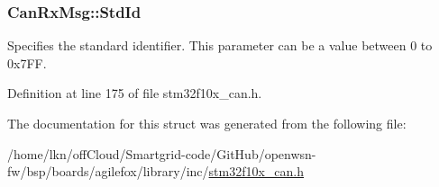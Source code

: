 \subsubsection[{\texorpdfstring{Std\+Id}{StdId}}]{ Can\+Rx\+Msg\+::\+Std\+Id}\hypertarget{struct_can_rx_msg_a62769e18836146f71238bee6b43b531e}{}\label{struct_can_rx_msg_a62769e18836146f71238bee6b43b531e}
Specifies the standard identifier. This parameter can be a value between 0 to 0x7\+FF. 

Definition at line 175 of file stm32f10x\+\_\+can.\+h.



The documentation for this struct was generated from the following file\+:\begin{DoxyCompactItemize}
\item 
/home/lkn/off\+Cloud/\+Smartgrid-\/code/\+Git\+Hub/openwsn-\/fw/bsp/boards/agilefox/library/inc/\hyperlink{agilefox_2library_2inc_2stm32f10x__can_8h}{stm32f10x\+\_\+can.\+h}\end{DoxyCompactItemize}
